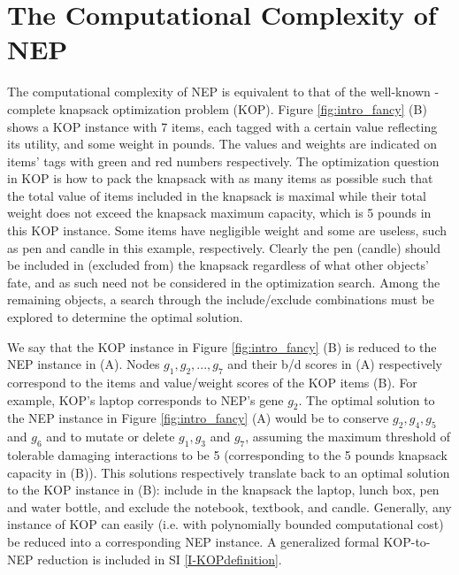 \section{The Computational Complexity of NEP}
    The computational complexity of NEP is equivalent to that of the well-known -complete knapsack optimization problem (KOP). Figure \ref{fig:intro_fancy} (B) shows a KOP instance with 7 items, each tagged with a certain value reflecting its utility, and some weight in pounds. The values and weights are indicated on items' tags with green and red numbers respectively. The optimization question in KOP is how to pack the knapsack with as many items as possible such that the total value of items included in the knapsack is maximal while their total weight does not exceed the knapsack maximum capacity, which is 5 pounds in this KOP instance. Some items have negligible weight and some are useless, such as pen and candle in this example, respectively. Clearly the pen (candle) should be included in (excluded from) the knapsack regardless of what other objects' fate, and as such need not be considered in the optimization search. Among the remaining objects, a search through the include/exclude combinations must be explored to determine the optimal solution.

    We say that the KOP instance in Figure \ref{fig:intro_fancy} (B) is reduced to the NEP instance in (A). Nodes $g_1, g_2, ..., g_7$ and their b/d scores in  (A) respectively correspond to the items and value/weight scores of the KOP items  (B). For example, KOP's laptop corresponds to NEP's gene $g_2$. The optimal solution to the NEP instance in Figure \ref{fig:intro_fancy} (A) would be to conserve $g_2, g_4,  g_5$ and  $g_6$ and to mutate or delete $g_1, g_3$ and $g_7$, assuming the maximum threshold of tolerable damaging interactions to be 5 (corresponding to the 5 pounds knapsack capacity in (B)). This solutions respectively translate back to an optimal solution to the KOP instance in (B):  include in  the knapsack the laptop, lunch box, pen and water bottle, and exclude the notebook, textbook, and candle. Generally, any instance of KOP can easily (i.e. with polynomially bounded computational cost) be reduced into a corresponding  NEP instance. A generalized formal KOP-to-NEP reduction is included in SI \ref{I-KOPdefinition}.

